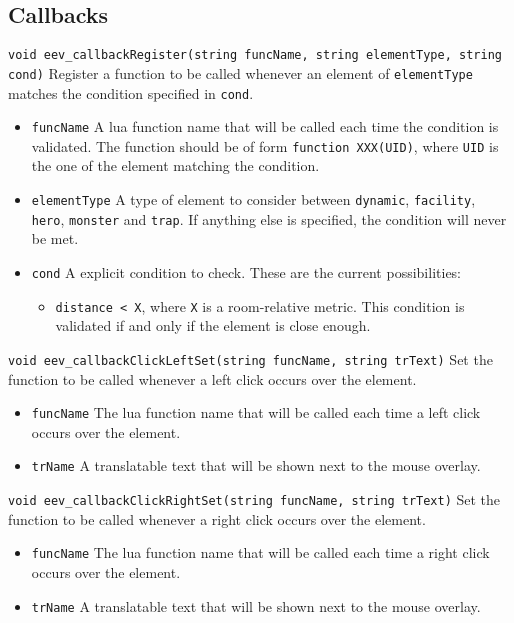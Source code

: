 \documentclass[10pt,a4paper]{scrartcl}
\newenvironment{apiCode}[1]
{ \begin{lrbox}{\mybox} \begin{minipage}{0.9\textwidth} {\texttt{#1}} \vspace{8pt} \newline }
{ \end{minipage} \end{lrbox}\fbox{\usebox{\mybox}} \newline\vspace{4pt}\newline }
\begin{document}
\subsection{Callbacks}
\begin{apiCode}{void eev_callbackRegister(string funcName, string elementType, string cond)}
Register a function to be called whenever an element of \texttt{elementType} matches the condition specified in \texttt{cond}.
\begin{itemize}
\itemsep 0em
\item \texttt{funcName} A lua function name that will be called each time the condition is validated. The function should be of form \texttt{function XXX(UID)}, where \texttt{UID} is the one of the element matching the condition.
\item \texttt{elementType} A type of element to consider between \texttt{dynamic}, \texttt{facility}, \texttt{hero}, \texttt{monster} and \texttt{trap}. If anything else is specified, the condition will never be met.
\item \texttt{cond} A explicit condition to check. These are the current possibilities:
    \begin{itemize}
    \itemsep 0em
    \item \texttt{distance < X}, where \texttt{X} is a room-relative metric. This condition is validated if and only if the element is close enough.
    \end{itemize}
\end{itemize}
\end{apiCode}
\begin{apiCode}{void eev_callbackClickLeftSet(string funcName, string trText)}
Set the function to be called whenever a left click occurs over the element.
\begin{itemize}
\itemsep 0em
\item \texttt{funcName} The lua function name that will be called each time a left click occurs over the element.
\item \texttt{trName} A translatable text that will be shown next to the mouse overlay.
\end{itemize}
\end{apiCode}
\begin{apiCode}{void eev_callbackClickRightSet(string funcName, string trText)}
Set the function to be called whenever a right click occurs over the element.
\begin{itemize}
\itemsep 0em
\item \texttt{funcName} The lua function name that will be called each time a right click occurs over the element.
\item \texttt{trName} A translatable text that will be shown next to the mouse overlay.
\end{itemize}
\end{apiCode}
\end{document}
